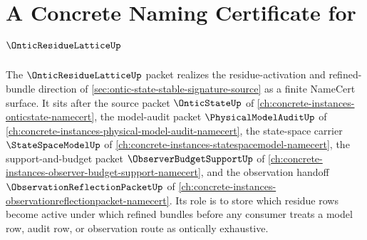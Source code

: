 \chapter{A Concrete Naming Certificate for $\OnticResidueLatticeUp$}
\label{ch:concrete-instances-ontic-residue-lattice-namecert}

The $\OnticResidueLatticeUp$ packet realizes the residue-activation and refined-bundle direction of \autoref{sec:ontic-state-stable-signature-source} as a finite NameCert surface. It sits after the source packet $\OnticStateUp$ of \autoref{ch:concrete-instances-onticstate-namecert}, the model-audit packet $\PhysicalModelAuditUp$ of \autoref{ch:concrete-instances-physical-model-audit-namecert}, the state-space carrier $\StateSpaceModelUp$ of \autoref{ch:concrete-instances-statespacemodel-namecert}, the support-and-budget packet $\ObserverBudgetSupportUp$ of \autoref{ch:concrete-instances-observer-budget-support-namecert}, and the observation handoff $\ObservationReflectionPacketUp$ of \autoref{ch:concrete-instances-observationreflectionpacket-namecert}. Its role is to store which residue rows become active under which refined bundles before any consumer treats a model row, audit row, or observation route as ontically exhaustive.

